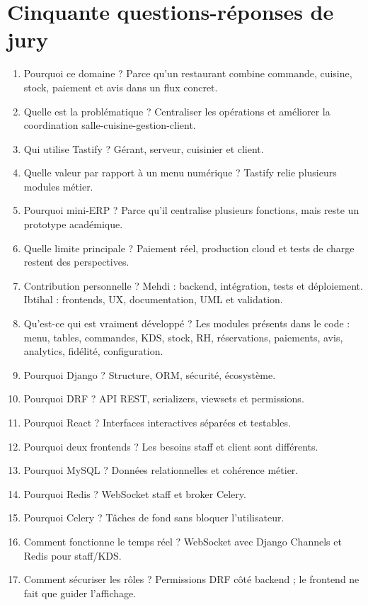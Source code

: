 \documentclass[11pt,a4paper]{article}
\begin{document}
\section{Cinquante questions-réponses de jury}

\begin{enumerate}
\item Pourquoi ce domaine ? Parce qu'un restaurant combine commande, cuisine, stock, paiement et avis dans un flux concret.
\item Quelle est la problématique ? Centraliser les opérations et améliorer la coordination salle-cuisine-gestion-client.
\item Qui utilise Tastify ? Gérant, serveur, cuisinier et client.
\item Quelle valeur par rapport à un menu numérique ? Tastify relie plusieurs modules métier.
\item Pourquoi mini-ERP ? Parce qu'il centralise plusieurs fonctions, mais reste un prototype académique.
\item Quelle limite principale ? Paiement réel, production cloud et tests de charge restent des perspectives.
\item Contribution personnelle ? Mehdi : backend, intégration, tests et déploiement. Ibtihal : frontends, UX, documentation, UML et validation.
\item Qu'est-ce qui est vraiment développé ? Les modules présents dans le code : menu, tables, commandes, KDS, stock, RH, réservations, paiements, avis, analytics, fidélité, configuration.
\item Pourquoi Django ? Structure, ORM, sécurité, écosystème.
\item Pourquoi DRF ? API REST, serializers, viewsets et permissions.
\item Pourquoi React ? Interfaces interactives séparées et testables.
\item Pourquoi deux frontends ? Les besoins staff et client sont différents.
\item Pourquoi MySQL ? Données relationnelles et cohérence métier.
\item Pourquoi Redis ? WebSocket staff et broker Celery.
\item Pourquoi Celery ? Tâches de fond sans bloquer l'utilisateur.
\item Comment fonctionne le temps réel ? WebSocket avec Django Channels et Redis pour staff/KDS.
\item Comment sécuriser les rôles ? Permissions DRF côté backend ; le frontend ne fait que guider l'affichage.

\end{enumerate}
\end{document}

